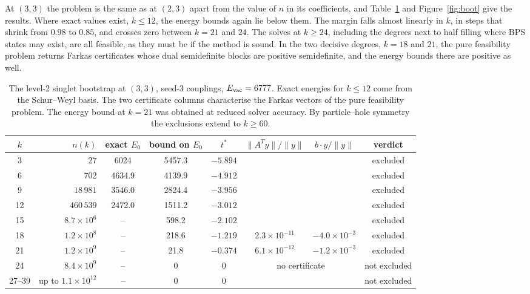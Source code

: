 \documentclass[10pt]{article}
\begin{document}
At $(3,3)$ the problem is the same as at $(2,3)$ apart from the value of $n$ in its coefficients, and
Table~\ref{tab:boot33} and Figure~\ref{fig:boot} give the results. Where exact values exist, $k\le12$, the energy
bounds again lie below them. The margin falls almost linearly in $k$, in steps that shrink from $0.98$ to $0.85$, and
crosses zero between $k=21$ and $24$. The solves at $k\ge24$, including the degrees next to half filling where BPS
states may exist, are all feasible, as they must be if the method is sound. In the two decisive degrees, $k=18$ and
$21$, the pure feasibility problem returns Farkas certificates whose dual semidefinite blocks are positive
semidefinite, and the energy bounds there are positive as well.

\begin{table}[t]\centering\small
\begin{tabular}{crcccccc}
\toprule
$k$ & $n(k)$ & exact $E_0$ & bound on $E_0$ & $t^*$ & $\|A^Ty\|/\|y\|$ & $b\cdot y/\|y\|$ & verdict\\
\midrule
3 & 27 & 6024 & 5457.3 & $-5.894$ & & & excluded\\
6 & 702 & 4634.9 & 4139.9 & $-4.912$ & & & excluded\\
9 & $18\,981$ & 3546.0 & 2824.4 & $-3.956$ & & & excluded\\
12 & $460\,539$ & 2472.0 & 1511.2 & $-3.012$ & & & excluded\\
15 & $8.7\times10^6$ & -- & 598.2 & $-2.102$ & & & excluded\\
18 & $1.2\times10^8$ & -- & 218.6 & $-1.219$ & $2.3\times10^{-11}$ & $-4.0\times10^{-3}$ & excluded\\
21 & $1.2\times10^9$ & -- & 21.8 & $-0.374$ & $6.1\times10^{-12}$ & $-1.2\times10^{-3}$ & excluded\\
24 & $8.4\times10^9$ & -- & 0 & 0 & \multicolumn{2}{c}{no certificate} & not excluded\\
27--39 & up to $1.1\times10^{12}$ & -- & 0 & 0 & & & not excluded\\
\bottomrule
\end{tabular}
\caption{The level-2 singlet bootstrap at $(3,3)$, seed-3 couplings, $E_{\rm vac}=6777$. Exact energies for $k\le12$
come from the Schur--Weyl basis. The two certificate columns characterise the Farkas vectors of the pure feasibility
problem. The energy bound at $k=21$ was obtained at reduced solver accuracy. By particle--hole symmetry the exclusions
extend to $k\ge60$.}
\label{tab:boot33}
\end{table}
\end{document}
